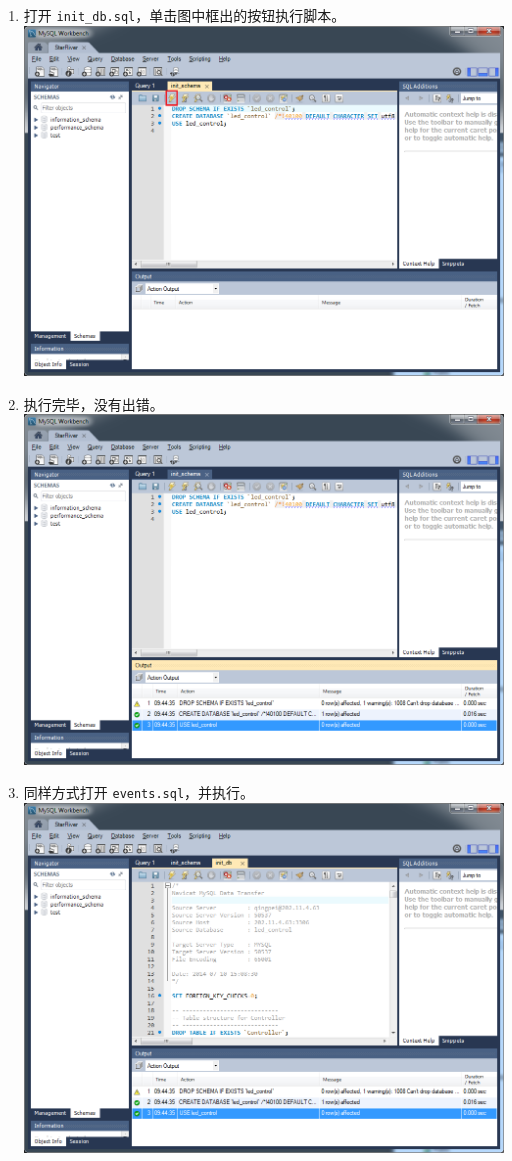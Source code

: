 \begin{enumerate}
\item
  打开 \texttt{init\_db.sql}，单击图中框出的按钮执行脚本。
  \includegraphics{img/db_init_7.png}
\item
  执行完毕，没有出错。 \includegraphics{img/db_init_8.png}
\item
  同样方式打开 \texttt{events.sql}，并执行。
  \includegraphics{img/db_init_9.png}

\end{enumerate}
